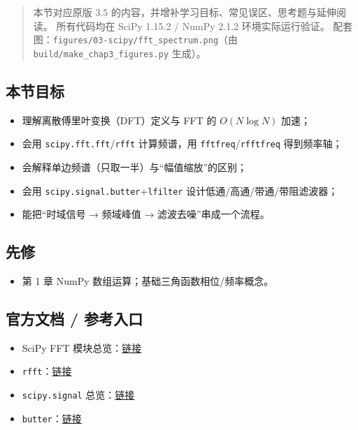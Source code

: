 \begin{quote}
本节对应原版 3.5 的内容，并增补学习目标、常见误区、思考题与延伸阅读。
所有代码均在 SciPy 1.15.2 / NumPy 2.1.2 环境实际运行验证。
配套图：\texttt{figures/03-scipy/fft\_spectrum.png}（由
\texttt{build/make\_chap3\_figures.py} 生成）。
\end{quote}

\subsection{本节目标}\label{ux672cux8282ux76eeux6807-17}

\begin{itemize}
\tightlist
\item
  理解离散傅里叶变换（DFT）定义与 FFT 的 \(O(N\log N)\) 加速；
\item
  会用 \texttt{scipy.fft.fft}/\texttt{rfft} 计算频谱，用
  \texttt{fftfreq}/\texttt{rfftfreq} 得到频率轴；
\item
  会解释单边频谱（只取一半）与``幅值缩放''的区别；
\item
  会用 \texttt{scipy.signal.butter}+\texttt{lfilter}
  设计低通/高通/带通/带阻滤波器；
\item
  能把``时域信号 → 频域峰值 → 滤波去噪''串成一个流程。
\end{itemize}

\subsection{先修}\label{ux5148ux4fee-10}

\begin{itemize}
\tightlist
\item
  第 1 章 NumPy 数组运算；基础三角函数相位/频率概念。
\end{itemize}

\subsection{官方文档 /
参考入口}\label{ux5b98ux65b9ux6587ux6863-ux53c2ux8003ux5165ux53e3-4}

\begin{itemize}
\tightlist
\item
  SciPy FFT
  模块总览：\href{https://docs.scipy.org/doc/scipy/reference/fft.html}{链接}
\item
  \texttt{rfft}：\href{https://docs.scipy.org/doc/scipy/reference/generated/scipy.fft.rfft.html}{链接}
\item
  \texttt{scipy.signal}
  总览：\href{https://docs.scipy.org/doc/scipy/reference/signal.html}{链接}
\item
  \texttt{butter}：\href{https://docs.scipy.org/doc/scipy/reference/generated/scipy.signal.butter.html}{链接}
\end{itemize}

